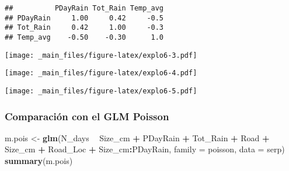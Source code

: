 \documentclass[
]{book}
\newenvironment{Shaded}{\begin{snugshade}}{\end{snugshade}}
\newcommand{\DataTypeTok}[1]{\textcolor[rgb]{0.13,0.29,0.53}{#1}}
\newcommand{\KeywordTok}[1]{\textcolor[rgb]{0.13,0.29,0.53}{\textbf{#1}}}
\newcommand{\NormalTok}[1]{#1}
\newcommand{\OperatorTok}[1]{\textcolor[rgb]{0.81,0.36,0.00}{\textbf{#1}}}
\newcommand{\StringTok}[1]{\textcolor[rgb]{0.31,0.60,0.02}{#1}}
\begin{document}
\begin{verbatim}
##          PDayRain Tot_Rain Temp_avg
## PDayRain     1.00     0.42     -0.5
## Tot_Rain     0.42     1.00     -0.3
## Temp_avg    -0.50    -0.30      1.0
\end{verbatim}

\begin{Shaded}
\end{Shaded}

\texttt{[image: \_main\_files/figure-latex/explo6-3.pdf]}

\begin{Shaded}
\end{Shaded}

\texttt{[image: \_main\_files/figure-latex/explo6-4.pdf]}

\begin{Shaded}
\end{Shaded}

\texttt{[image: \_main\_files/figure-latex/explo6-5.pdf]}

\hypertarget{comparaciuxf3n-con-el-glm-poisson}{%
\subsubsection{Comparación con el GLM Poisson}\label{comparaciuxf3n-con-el-glm-poisson}}

\begin{Shaded}
\begin{Highlighting}[]
\NormalTok{m.pois <-}\StringTok{ }\KeywordTok{glm}\NormalTok{(N_days }\OperatorTok{~}\StringTok{ }\NormalTok{Size_cm }\OperatorTok{+}\StringTok{ }\NormalTok{PDayRain }\OperatorTok{+}\StringTok{ }\NormalTok{Tot_Rain }\OperatorTok{+}\StringTok{ }\NormalTok{Road }\OperatorTok{+}\StringTok{ }\NormalTok{Size_cm }\OperatorTok{+}\StringTok{ }\NormalTok{Road_Loc }\OperatorTok{+}\StringTok{ }\NormalTok{Size_cm}\OperatorTok{:}\NormalTok{PDayRain, }\DataTypeTok{family =}\NormalTok{ poisson, }\DataTypeTok{data =}\NormalTok{ serp)}
\KeywordTok{summary}\NormalTok{(m.pois)}
\end{Highlighting}
\end{Shaded}
\end{document}

